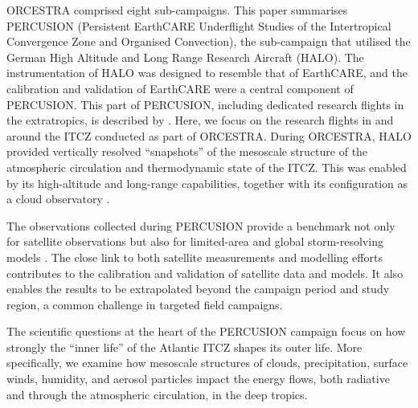 \documentclass[acp, manuscript]{copernicus}
\begin{document}
ORCESTRA comprised eight sub-campaigns.
This paper summarises PERCUSION (Persistent EarthCARE Underflight Studies of the Intertropical Convergence Zone and Organised Convection), the sub-campaign that utilised the German High Altitude and Long Range Research Aircraft (HALO).
The instrumentation of HALO was designed to resemble that of EarthCARE, and the calibration and validation of EarthCARE were a central component of PERCUSION.
This part of PERCUSION, including dedicated research flights in the extratropics, is described by \cite{grossPersistentEarthCAREUnderflight2026}.
Here, we focus on the research flights in and around the ITCZ conducted as part of ORCESTRA.
During ORCESTRA, HALO provided vertically resolved ``snapshots'' of the mesoscale structure of the atmospheric circulation and thermodynamic state of the ITCZ.
This was enabled by its high-altitude and long-range capabilities, together with its configuration as a cloud observatory \citep{stevensHighAltitudeLongRangeAircraft2019, bonyMeasuringAreaAveragedVertical2019, georgeJOANNEJointDropsonde2021}.

The observations collected during PERCUSION provide a benchmark not only for satellite observations but also for limited-area and global storm-resolving models \citep[e.g.,][]{Klocke2017a, satohGlobalCloudResolvingModels2019, fievetTropicalConvectionStormresolving2026}.
The close link to both satellite measurements and modelling efforts contributes to the calibration and validation of satellite data and models.
It also enables the results to be extrapolated beyond the campaign period and study region, a common challenge in targeted field campaigns.

The scientific questions at the heart of the PERCUSION campaign focus on how strongly the ``inner life'' of the Atlantic ITCZ \citep{windmillerInnerLifeAtlantic2024} shapes its outer life.
More specifically, we examine how mesoscale structures of clouds, precipitation, surface winds, humidity, and aerosol particles impact the energy flows, both radiative and through the atmospheric circulation, in the deep tropics.
\end{document}

